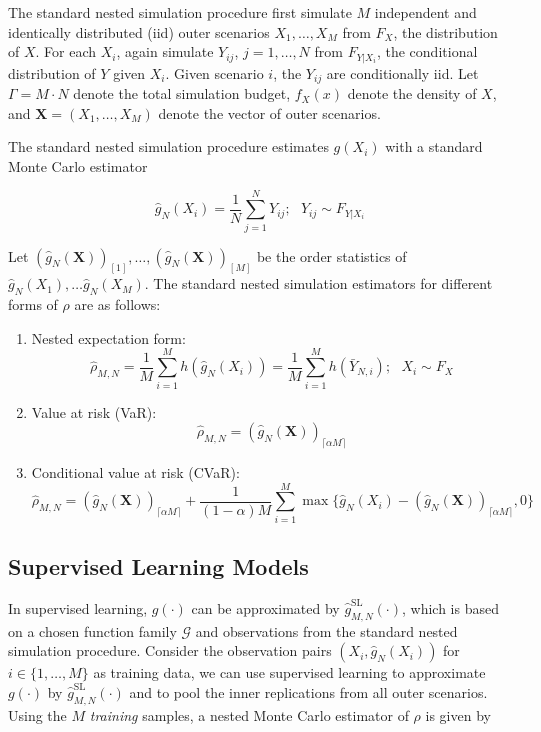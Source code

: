 \documentclass{article}
\begin{document}
The standard nested simulation procedure first simulate $M$ independent and identically distributed (iid) outer scenarios $X_1, \dots, X_M$ from $F_X$, the distribution of $X$.
For each $X_i$, again simulate $Y_{ij}$, $j = 1, \dots, N$ from $F_{Y|X_i}$, the conditional distribution of $Y$ given $X_i$. Given scenario $i$, the $Y_{ij}$ are conditionally iid. Let $\Gamma = M \cdot N$ denote the total simulation budget, $f_X(x)$ denote the density of $X$, and $\mathbf{X} = (X_1, \dots, X_M)$ denote the vector of outer scenarios.

The standard nested simulation procedure estimates $g(X_i)$ with a standard Monte Carlo estimator 

$$\hat{g}_N(X_i) = \frac{1}{N} \sum_{j=1}^N Y_{ij}; ~~~ Y_{ij} \sim F_{Y|X_i} $$

Let $(\hat{g}_N(\mathbf{X}))_{[1]}, \dots, (\hat{g}_N(\mathbf{X}))_{[M]}$ be the order statistics of $\hat{g}_N(X_1), \dots \hat{g}_N(X_M)$. 
The standard nested simulation estimators for different forms of $\rho$ are as follows:

\begin{enumerate}
    \item   Nested expectation form:
            $$\hat{\rho}_{M, N} = \frac{1}{M} \sum_{i=1}^M h(\hat{g}_N(X_i)) = \frac{1}{M} \sum_{i=1}^M h(\bar{Y}_{N, i}); ~~~ X_i \sim F_X$$
    \item   Value at risk (VaR):
            $$\hat{\rho}_{M, N} = (\hat{g}_N(\mathbf{X}))_{\lceil \alpha M \rceil}$$
    \item   Conditional value at risk (CVaR):
            $$\hat{\rho}_{M, N} = (\hat{g}_N(\mathbf{X}))_{\lceil \alpha M \rceil} + \frac{1}{(1-\alpha) M} \sum_{i=1}^M \max \{\hat{g}_N(X_i) - (\hat{g}_N(\mathbf{X}))_{\lceil \alpha M \rceil}, 0 \}$$
\end{enumerate}

\subsection{Supervised Learning Models}

In supervised learning, $g(\cdot)$ can be approximated by $\hat{g}^{\text{SL}}_{M, N}(\cdot)$, which is based on a chosen function family $\mathcal{G}$ and observations from the standard nested simulation procedure.
Consider the observation pairs $(X_i, \hat{g}_N(X_i))$ for $i \in \{1, \dots, M\}$ as training data, we can use supervised learning to approximate $g(\cdot)$ by $\hat{g}^{\text{SL}}_{M, N}(\cdot)$ and to pool the inner replications from all outer scenarios.
Using the $M$ \textit{training} samples, a nested Monte Carlo estimator of $\rho$ is given by
\end{document}
